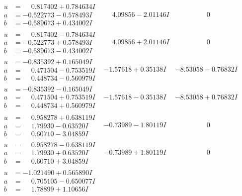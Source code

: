 \documentclass[1p]{elsarticle_modified}
\theoremstyle{definition}
\begin{document}
$$\begin{array}{c|c|c}
\begin{aligned}
u &= \phantom{-}0.817402 + 0.784634 I \\
a &= -0.522773 - 0.578493 I \\
b &= -0.589673 + 0.434002 I\end{aligned}
 & \phantom{-}4.09856 - 2.01146 I & \phantom{-0.000000 } 0 \\ \hline\begin{aligned}
u &= \phantom{-}0.817402 - 0.784634 I \\
a &= -0.522773 + 0.578493 I \\
b &= -0.589673 - 0.434002 I\end{aligned}
 & \phantom{-}4.09856 + 2.01146 I & \phantom{-0.000000 } 0 \\ \hline\begin{aligned}
u &= -0.835392 + 0.165049 I \\
a &= \phantom{-}0.471504 - 0.753519 I \\
b &= \phantom{-}0.448734 - 0.560979 I\end{aligned}
 & -1.57618 + 0.35138 I & -8.53058 - 0.76832 I \\ \hline\begin{aligned}
u &= -0.835392 - 0.165049 I \\
a &= \phantom{-}0.471504 + 0.753519 I \\
b &= \phantom{-}0.448734 + 0.560979 I\end{aligned}
 & -1.57618 - 0.35138 I & -8.53058 + 0.76832 I \\ \hline\begin{aligned}
u &= \phantom{-}0.958278 + 0.638119 I \\
a &= \phantom{-}1.79930 - 0.63520 I \\
b &= \phantom{-}0.60710 - 3.04859 I\end{aligned}
 & -0.73989 - 1.80119 I & \phantom{-0.000000 } 0 \\ \hline\begin{aligned}
u &= \phantom{-}0.958278 - 0.638119 I \\
a &= \phantom{-}1.79930 + 0.63520 I \\
b &= \phantom{-}0.60710 + 3.04859 I\end{aligned}
 & -0.73989 + 1.80119 I & \phantom{-0.000000 } 0 \\ \hline\begin{aligned}
u &= -1.021490 + 0.565890 I \\
a &= \phantom{-}0.705105 - 0.650077 I \\
b &= \phantom{-}1.78899 + 1.10656 I\end{aligned}

\end{array}$$
\end{document}
